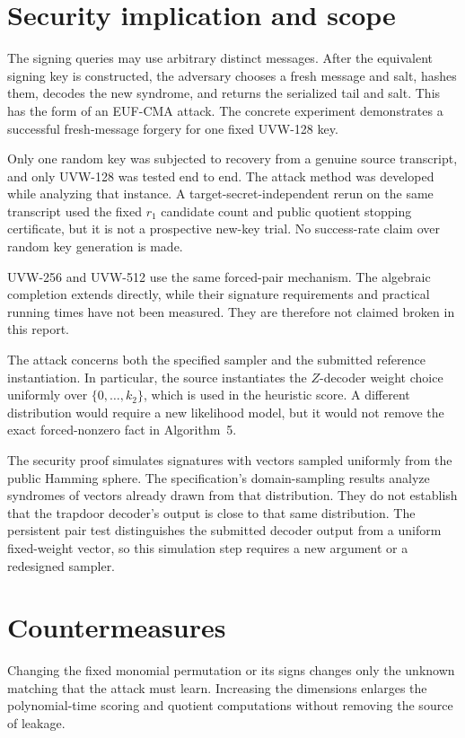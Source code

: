 \documentclass[11pt,a4paper]{article}
\begin{document}
\section{Security implication and scope}

The signing queries may use arbitrary distinct messages.  After the
equivalent signing key is constructed, the adversary chooses a fresh message
and salt, hashes them, decodes the new syndrome, and returns the serialized
tail and salt.  This has the form of an EUF-CMA attack.  The concrete
experiment demonstrates a successful fresh-message forgery for one fixed UVW-128 key.

Only one random key was subjected to recovery from a genuine source
transcript, and only UVW-128 was tested end to end.  The attack method was
developed while analyzing that instance.  A target-secret-independent rerun
on the same transcript used the fixed $r_1$ candidate count and public quotient stopping
certificate, but it is not a prospective new-key trial.  No success-rate
claim over random key generation is made.

UVW-256 and UVW-512 use the same forced-pair mechanism.  The algebraic
completion extends directly, while their signature requirements and
practical running times have not been measured.  They are therefore not
claimed broken in this report.

The attack concerns both the specified sampler and the submitted reference
instantiation.  In particular, the source instantiates the $Z$-decoder
weight choice uniformly over $\{0,\ldots,k_2\}$, which is used in the
heuristic score.  A different distribution would require a new likelihood
model, but it would not remove the exact forced-nonzero fact in
Algorithm~5.

The security proof simulates signatures with vectors sampled uniformly from
the public Hamming sphere.  The specification's domain-sampling results
analyze syndromes of vectors already drawn from that distribution.  They do
not establish that the trapdoor decoder's output is close to that same
distribution.  The persistent pair test distinguishes the submitted decoder
output from a uniform fixed-weight vector, so this simulation step requires a
new argument or a redesigned sampler.

\section{Countermeasures}

Changing the fixed monomial permutation or its signs changes only the unknown
matching that the attack must learn.  Increasing the dimensions enlarges
the polynomial-time scoring and quotient computations without removing the source of leakage.
\end{document}
